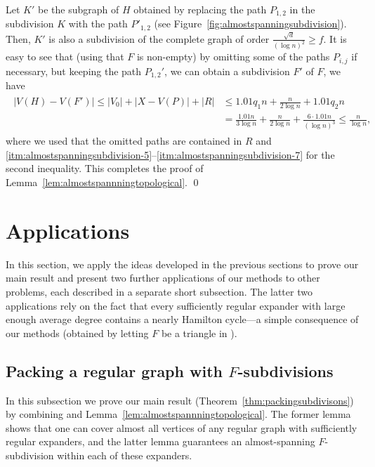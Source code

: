 \documentclass[10pt]{article}
\theoremstyle{plain}
\numberwithin{theorem}{section}
\theoremstyle{definition}
\theoremstyle{remark}
\renewenvironment{proof}[1][]{\begin{trivlist}
\item[\hspace{\labelsep}{\bf\noindent Proof#1.\/}] }{\qed\end{trivlist}}
\renewcommand{\setminus}{-}
\theoremstyle{plain}
\begin{document}
\begin{proof}[ of Lemma~\ref{lem:almostspannningtopological}]
		Let $K'$ be the subgraph of $H$ obtained by replacing the path $P_{1,2}$ in the subdivision $K$ with the path $P'_{1,2}$ (see Figure~\ref{fig:almostspanningsubdivision}). 
		Then, $K'$ is also a subdivision of the complete graph of order $\frac{\sqrt{d}}{(\log n)^2} \ge f$. 
		It is easy to see that (using that $F$ is non-empty) by omitting some of the paths $P_{i,j}$ if necessary, but keeping the path $P_{1,2}'$, we can obtain a subdivision $F'$ of $F$, we have
		\begin{align} \label{eqn:Kprime}
			\begin{split}
				|V(H) \setminus V(F')| 
				\le |V_0|+|X \setminus V(P)|+ |R| 
				&\le 1.01 q_1 n + \frac{n}{2\log n} + 1.01 q_2 n \\ 
				&= \frac{1.01n}{3\log n} + \frac{n}{2 \log n} + \frac{6 \cdot 1.01 n}{(\log n)^{3}} \le \frac{n}{\log n},
			\end{split}
		\end{align}
		where we used that the omitted paths are contained in $R$ and \ref{itm:almostspanningsubdivision-5}--\ref{itm:almostspanningsubdivision-7} for the second inequality. 
		This completes the proof of Lemma~\ref{lem:almostspannningtopological}.         
\end{proof}



\section{Applications}
\label{sec:application:chords}


In this section, we apply the ideas developed in the previous sections to prove our main result and present two further applications of our methods to other problems, each described in a separate short subsection. The latter two applications rely on the fact that every sufficiently regular expander with large enough average degree contains a nearly Hamilton cycle—a simple consequence of our methods (obtained by letting $F$ be a triangle in ).


\subsection{Packing a regular graph with \texorpdfstring{$F$}{F}-subdivisions}
\label{sec:proofofmainresult}

	In this subsection we prove our main result (Theorem~\ref{thm:packingsubdivisons}) by combining  and Lemma~\ref{lem:almostspannningtopological}. The former lemma shows that one can cover almost all vertices of any regular graph with sufficiently regular expanders, and the latter lemma guarantees an almost-spanning $F$-subdivision  within each of these expanders.
\end{document}
